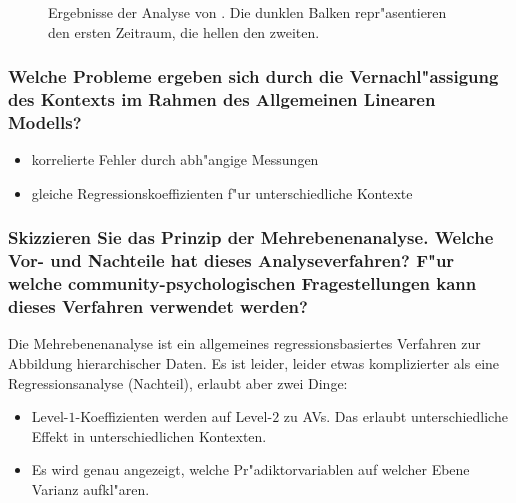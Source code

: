 \begin{figure}[hb!]
\begin{center}
        \end{center}
        \caption{Ergebnisse der Analyse von \textcite{luke_getting_2005}. Die dunklen Balken repr"asentieren den ersten Zeitraum, die hellen den zweiten.}
        \label{fig:luke1}
\end{figure}

\subsubsection{Welche Probleme ergeben sich durch die Vernachl"assigung des Kontexts im Rahmen des Allgemeinen Linearen Modells?}
\begin{itemize}
  \item korrelierte Fehler durch abh"angige Messungen
  \item gleiche Regressionskoeffizienten f"ur unterschiedliche Kontexte
\end{itemize}

\subsubsection{Skizzieren Sie das Prinzip der Mehrebenenanalyse. Welche Vor- und Nachteile hat dieses Analyseverfahren? F"ur welche community-psychologischen Fragestellungen kann dieses Verfahren verwendet werden?}
Die Mehrebenenanalyse ist ein allgemeines regressionsbasiertes Verfahren zur Abbildung hierarchischer Daten. Es ist leider, leider etwas komplizierter als eine Regressionsanalyse (Nachteil), erlaubt aber zwei Dinge:

\begin{itemize}
  \item Level-$1$-Koeffizienten werden auf Level-$2$ zu AVs. Das erlaubt unterschiedliche Effekt in unterschiedlichen Kontexten.
  \item Es wird genau angezeigt, welche Pr"adiktorvariablen auf welcher Ebene Varianz aufkl"aren.
\end{itemize}

